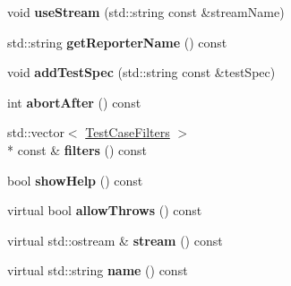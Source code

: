 \begin{DoxyCompactItemize}
\item 
\hypertarget{class_catch_1_1_config_ad54597f3f1f23f5a1cc862b5029bf231}{void {\bfseries use\-Stream} (std\-::string const \&stream\-Name)}\label{class_catch_1_1_config_ad54597f3f1f23f5a1cc862b5029bf231}

\item 
\hypertarget{class_catch_1_1_config_a6973175899892f42dd47a1d7701fbed7}{std\-::string {\bfseries get\-Reporter\-Name} () const }\label{class_catch_1_1_config_a6973175899892f42dd47a1d7701fbed7}

\item 
\hypertarget{class_catch_1_1_config_a50283ece0b30d1cd3c8e47588942232a}{void {\bfseries add\-Test\-Spec} (std\-::string const \&test\-Spec)}\label{class_catch_1_1_config_a50283ece0b30d1cd3c8e47588942232a}

\item 
\hypertarget{class_catch_1_1_config_a0ab98435c16d87681d370266b8755672}{int {\bfseries abort\-After} () const }\label{class_catch_1_1_config_a0ab98435c16d87681d370266b8755672}

\item 
\hypertarget{class_catch_1_1_config_ab91866ab6b895892ac29b4e9cfc1c1dd}{std\-::vector$<$ \hyperlink{class_catch_1_1_test_case_filters}{Test\-Case\-Filters} $>$\\*
 const \& {\bfseries filters} () const }\label{class_catch_1_1_config_ab91866ab6b895892ac29b4e9cfc1c1dd}

\item 
\hypertarget{class_catch_1_1_config_a338e89c6dd7c90d2772fc161cb77e9b4}{bool {\bfseries show\-Help} () const }\label{class_catch_1_1_config_a338e89c6dd7c90d2772fc161cb77e9b4}

\item 
\hypertarget{class_catch_1_1_config_ae6a5aea5e85afc2886b5ec8e3b610afa}{virtual bool {\bfseries allow\-Throws} () const }\label{class_catch_1_1_config_ae6a5aea5e85afc2886b5ec8e3b610afa}

\item 
\hypertarget{class_catch_1_1_config_a51a5f372698eaed4dd89c8bb03d2fdc4}{virtual std\-::ostream \& {\bfseries stream} () const }\label{class_catch_1_1_config_a51a5f372698eaed4dd89c8bb03d2fdc4}

\item 
\hypertarget{class_catch_1_1_config_a740c0195e2935033b71e3c3eaf0220c9}{virtual std\-::string {\bfseries name} () const }\label{class_catch_1_1_config_a740c0195e2935033b71e3c3eaf0220c9}


\end{DoxyCompactItemize}
